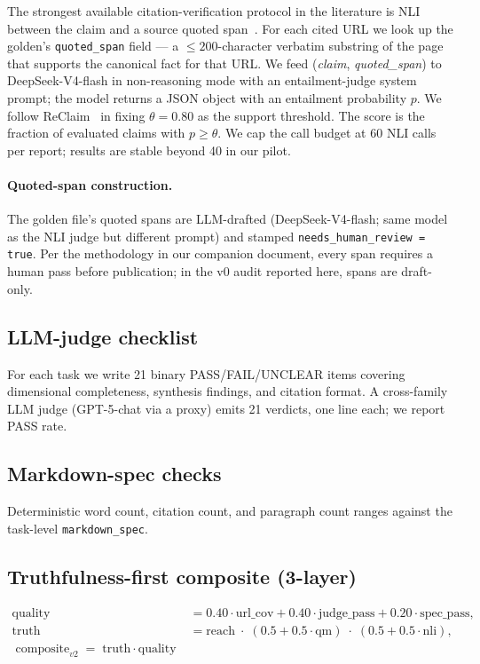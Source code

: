 \documentclass[11pt]{article}
\begin{document}
The strongest available citation-verification protocol in the
literature is NLI between the claim and a source quoted span~\citep{rarr,citeeval,reclaim}. For each cited URL we look up the
golden's \texttt{quoted\_span} field — a $\leq 200$-character verbatim
substring of the page that supports the canonical fact for that URL.
We feed (\textit{claim}, \textit{quoted\_span}) to DeepSeek-V4-flash in
non-reasoning mode with an entailment-judge system prompt; the model
returns a JSON object with an entailment probability $p$. We follow
ReClaim~\citep{reclaim} in fixing $\theta = 0.80$ as the support
threshold. The score is the fraction of evaluated claims with
$p \geq \theta$. We cap the call budget at 60 NLI calls per report;
results are stable beyond 40 in our pilot.

\paragraph{Quoted-span construction.} The golden file's quoted spans
are LLM-drafted (DeepSeek-V4-flash; same model as the NLI judge but
different prompt) and stamped \texttt{needs\_human\_review = true}.
Per the methodology in our companion document, every span requires a
human pass before publication; in the v0 audit reported here, spans
are draft-only.

\subsection{LLM-judge checklist}

For each task we write 21 binary PASS/FAIL/UNCLEAR items covering
dimensional completeness, synthesis findings, and citation format. A
cross-family LLM judge (GPT-5-chat via a proxy) emits 21 verdicts,
one line each; we report PASS rate.

\subsection{Markdown-spec checks}

Deterministic word count, citation count, and paragraph count ranges
against the task-level \texttt{markdown\_spec}.

\subsection{Truthfulness-first composite (3-layer)}

\begin{align}
  \label{eq:quality}
  \mathrm{quality}
   &= 0.40\cdot\mathrm{url\_cov} +
      0.40\cdot\mathrm{judge\_pass} +
      0.20\cdot\mathrm{spec\_pass}, \\
  \label{eq:truth}
  \mathrm{truth}
   &= \mathrm{reach} \;\cdot\;
      (0.5 + 0.5\cdot\mathrm{qm}) \;\cdot\;
      (0.5 + 0.5\cdot\mathrm{nli}), \\
  \label{eq:composite}
  \boxed{\;\mathrm{composite}_{v2} \;=\; \mathrm{truth} \cdot \mathrm{quality}\;}
\end{align}
\end{document}

